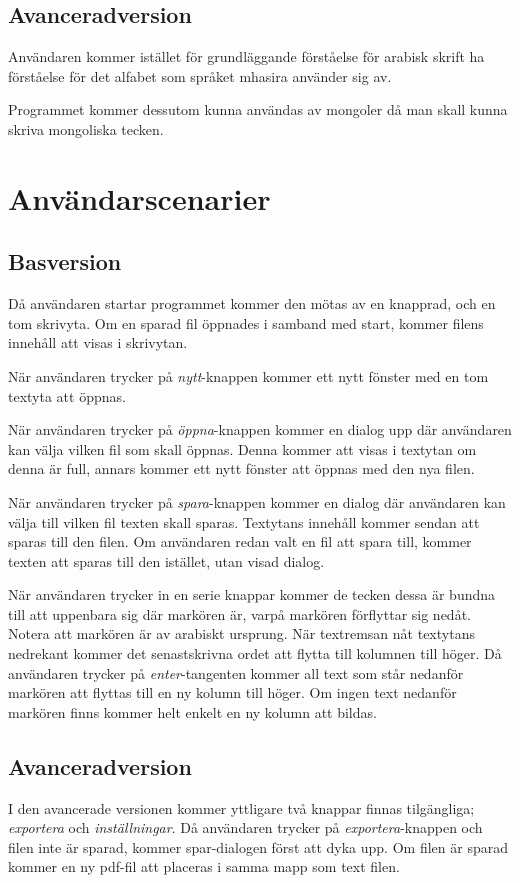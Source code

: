 \documentclass[a4paper,11p,twoside]{report}
\begin{document}
\subsection{Avanceradversion}
Användaren kommer istället för grundläggande förståelse för arabisk skrift ha förståelse för det alfabet som språket mhasira använder sig av.

Programmet kommer dessutom kunna användas av mongoler då man skall kunna skriva mongoliska tecken.

\section{Användarscenarier}
\subsection{Basversion}
Då användaren startar programmet kommer den mötas av en knapprad, och en tom skrivyta. Om en sparad fil öppnades i samband med start, kommer filens innehåll att visas i skrivytan.

När användaren trycker på \emph{nytt}-knappen kommer ett nytt fönster med en tom textyta att öppnas. 

När användaren trycker på \emph{öppna}-knappen kommer en dialog upp där användaren kan välja vilken fil som skall öppnas. Denna kommer att visas i textytan om denna är full, annars kommer ett nytt fönster att öppnas med den nya filen.

När användaren trycker på \emph{spara}-knappen kommer en dialog där användaren kan välja till vilken fil texten skall sparas. Textytans innehåll kommer sendan att sparas till den filen. Om användaren redan valt en fil att spara till, kommer texten att sparas till den istället, utan visad dialog.

När användaren trycker in en serie knappar kommer de tecken dessa är bundna till att uppenbara sig där markören är, varpå markören förflyttar sig nedåt. Notera att markören är av arabiskt ursprung. När textremsan nåt textytans nedrekant kommer det senastskrivna ordet att flytta till kolumnen till höger. Då användaren trycker på \emph{enter}-tangenten kommer all text som står nedanför markören att flyttas till en ny kolumn till höger. Om ingen text nedanför markören finns kommer helt enkelt en ny kolumn att bildas.

\subsection{Avanceradversion}
I den avancerade versionen kommer yttligare två knappar finnas tilgängliga; \emph{exportera} och \emph{inställningar}. Då användaren trycker på \emph{exportera}-knappen och filen inte är sparad, kommer spar-dialogen först att dyka upp. Om filen är sparad kommer en ny pdf-fil att placeras i samma mapp som text filen.
\end{document}
